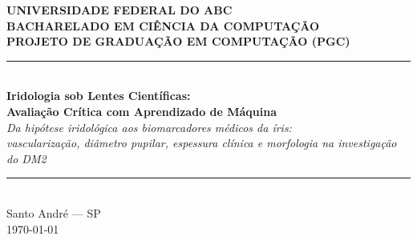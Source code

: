 \documentclass[12pt,a4paper]{article}
\begin{document}
\hypersetup{pageanchor=false}

\begin{titlepage}
\begin{center}

{\large \textbf{UNIVERSIDADE FEDERAL DO ABC}}\\[0.25cm]
{\large \textbf{BACHARELADO EM CIÊNCIA DA COMPUTAÇÃO}}\\[0.25cm]
{\large \textbf{PROJETO DE GRADUAÇÃO EM COMPUTAÇÃO (PGC)}}\\[1.2cm]

\rule{\textwidth}{0.4pt}\\[0.4cm]
{\LARGE \textbf{Iridologia sob Lentes Científicas:}}\\[0.2cm]
{\Large \textbf{Avaliação Crítica com Aprendizado de Máquina}}\\[0.3cm]
{\large \textit{Da hipótese iridológica aos biomarcadores médicos da íris:\\
vascularização, diâmetro pupilar, espessura clínica e morfologia na investigação do DM2}}\\[0.3cm]
\rule{\textwidth}{0.4pt}\\[1.2cm]

\vfill
{\normalsize Santo André --- SP}\\
{\normalsize \today}

\end{center}
\end{titlepage}
\end{document}
